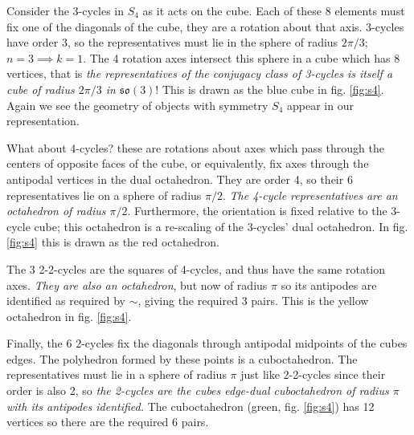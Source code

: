 \documentclass{amsart}
\theoremstyle{plain}
\theoremstyle{definition}
\begin{document}
Consider the 3-cycles in $S_4$ as it acts on the cube. Each of these 8 elements must fix one of the diagonals of the cube, they are a rotation about that axis. 3-cycles have order 3, so the representatives must lie in the sphere of radius $2\pi/3$; $n=3\implies k=1$. The 4 rotation axes intersect this sphere in a cube which has 8 vertices, that is \emph{the representatives of the conjugacy class of 3-cycles is itself a cube of radius $2\pi/3$ in $\mathfrak{so}(3)$}! This is drawn as the blue cube in fig. \ref{fig:s4}. Again we see the geometry of objects with symmetry $S_4$ appear in our representation.

What about 4-cycles? these are rotations about axes which pass through the centers of opposite faces of the cube, or equivalently, fix axes through the antipodal vertices in the dual octahedron. They are order 4, so their 6 representatives lie on a sphere of radius $\pi/2$. \emph{The 4-cycle representatives are an octahedron of radius $\pi/2$}. Furthermore, the orientation is fixed relative to the 3-cycle cube; this octahedron is a re-scaling of the 3-cycles' dual octahedron. In fig. \ref{fig:s4} this is drawn as the red octahedron.

The 3 2-2-cycles are the squares of 4-cycles, and thus have the same rotation axes. \emph{They are also an octahedron}, but now of radius $\pi$ so its antipodes are identified as required by $\sim$, giving the required 3 pairs. This is the yellow octahedron in fig. \ref{fig:s4}.

Finally, the 6 2-cycles fix the diagonals through antipodal midpoints of the cubes edges. The polyhedron formed by these points is a cuboctahedron. The representatives must lie in a sphere of radius $\pi$ just like 2-2-cycles since their order is also 2, so \emph{the 2-cycles are the cubes edge-dual cuboctahedron of radius $\pi$ with its antipodes identified.} The cuboctahedron (green, fig. \ref{fig:s4}) has 12 vertices so there are the required 6 pairs.
\end{document}
